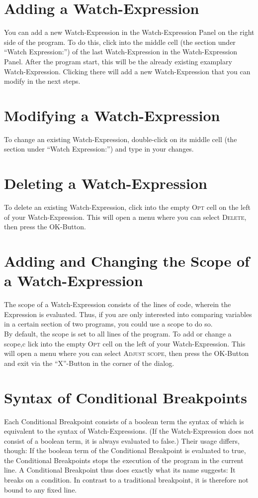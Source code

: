 \documentclass[parskip=full]{memoir}
\begin{document}
\section{Adding a Watch-Expression}\label{adding}
You can add a new Watch-Expression in the Watch-Expression Panel on the right side of the program. To do this, click into the middle cell (the section under \enquote{Watch Expression:}) of the last Watch-Expression in the Watch-Expression Panel. After the program start, this will be the already existing examplary Watch-Expression. Clicking there will add a new Watch-Expression that you can modify in the next steps.

\section{Modifying a Watch-Expression}\label{modifying}
To change an existing Watch-Expression, double-click on its middle cell (the section under \enquote{Watch Expression:}) and type in your changes.

\section{Deleting a Watch-Expression}\label{deleting}
To delete an existing Watch-Expression, click into the empty \textsc{Opt} cell on the left of your Watch-Expression. This will open a menu where you can select \textsc{Delete}, then press the \textsc{OK}-Button.

\section{Adding and Changing the Scope of a Watch-Expression}\label{scope}
The scope of a Watch-Expression consists of the lines of code, wherein the Expression is evaluated. Thus, if you are only interested into comparing variables in a certain section of two programs, you could use a scope to do so. \\
By default, the scope is set to all lines of the program.
To add or change a scope,c lick into the empty \textsc{Opt} cell on the left of your Watch-Expression. This will open a menu where you can select \textsc{Adjust scope}, then press the \textsc{OK}-Button and exit via the \enquote{X}-Button in the corner of the dialog.

\section{Syntax of Conditional Breakpoints}
Each Conditional Breakpoint consists of a boolean term the syntax of which is equivalent to the syntax of Watch-Expressions. (If the Watch-Expression does not consist of a boolean term, it is always evaluated to false.) Their usage differs, though: If the boolean term of the Conditional Breakpoint is evaluated to true, the Conditional Breakpoints stops the execution of the program in the current line. A Conditional Breakpoint thus does exactly what its name suggests: It breaks on a condition. In contrast to a traditional breakpoint, it is therefore not bound to any fixed line.
\end{document}
